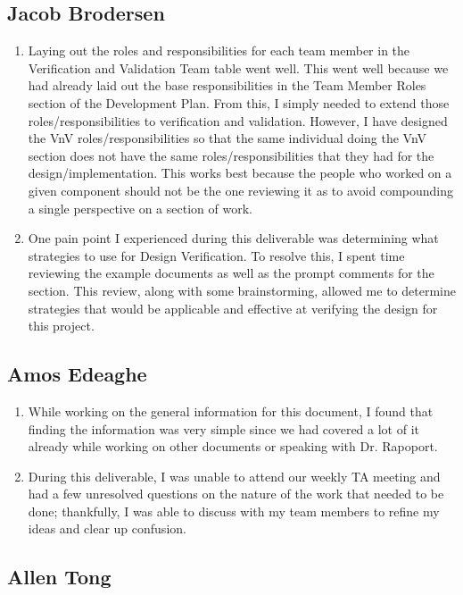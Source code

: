 \documentclass[12pt, titlepage]{article}
\begin{document}
\subsection*{Jacob Brodersen}

\begin{enumerate}
  \item Laying out the roles and responsibilities for each team member in the Verification and Validation Team table went well. This went well because we had already laid out the base responsibilities in the Team Member Roles section of the Development Plan. From this, I simply needed to extend those roles/responsibilities to verification and validation. However, I have designed the VnV roles/responsibilities so that the same individual doing the VnV section does not have the same roles/responsibilities that they had for the design/implementation. This works best because the people who worked on a given component should not be the one reviewing it as to avoid compounding a single perspective on a section of work.
  \item One pain point I experienced during this deliverable was determining what strategies to use for Design Verification. To resolve this, I spent time reviewing the example documents as well as the prompt comments for the section. This review, along with some brainstorming, allowed me to determine strategies that would be applicable and effective at verifying the design for this project.
\end{enumerate}

\subsection*{Amos Edeaghe}

\begin{enumerate}
  \item While working on the general information for this document, I found that finding the information was very simple since we had covered a lot of it already while working on other documents or speaking with Dr. Rapoport.
  \item During this deliverable, I was unable to attend our weekly TA meeting and had a few unresolved questions on the nature of the work that needed to be done; thankfully, I was able to discuss with my team members to refine my ideas and clear up confusion.
\end{enumerate}

\subsection*{Allen Tong}
\end{document}
